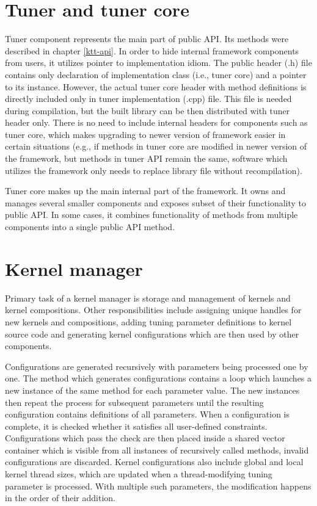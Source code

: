 \documentclass
[
    digital, %
    oneside, %
    table, %
    nolof, %
    nolot, %
    nocover %
]{fithesis3}
\begin{document}
\section{Tuner and tuner core}
Tuner component represents the main part of public API. Its methods were described in chapter \ref{ktt-api}. In order to hide internal framework
components from users, it utilizes pointer to implementation idiom. The public header (.h) file contains only declaration of implementation class
(i.e., tuner core) and a pointer to its instance. However, the actual tuner core header with method definitions is directly included only in tuner
implementation (.cpp) file. This file is needed during compilation, but the built library can be then distributed with tuner header only. There is
no need to include internal headers for components such as tuner core, which makes upgrading to newer version of framework easier in certain situations
(e.g., if methods in tuner core are modified in newer version of the framework, but methods in tuner API remain the same, software which utilizes the
framework only needs to replace library file without recompilation).

Tuner core makes up the main internal part of the framework. It owns and manages several smaller components and exposes subset of their functionality
to public API. In some cases, it combines functionality of methods from multiple components into a single public API method.

\section{Kernel manager}
Primary task of a kernel manager is storage and management of kernels and kernel compositions. Other responsibilities include assigning unique handles for
new kernels and compositions, adding tuning parameter definitions to kernel source code and generating kernel configurations which are then used by other
components.

Configurations are generated recursively with parameters being processed one by one. The method which generates configurations contains a loop which
launches a new instance of the same method for each parameter value. The new instances then repeat the process for subsequent parameters until the
resulting configuration contains definitions of all parameters. When a configuration is complete, it is checked whether it satisfies all user-defined
constraints. Configurations which pass the check are then placed inside a shared vector container which is visible from all instances of recursively
called methods, invalid configurations are discarded. Kernel configurations also include global and local kernel thread sizes, which are updated when
a thread-modifying tuning parameter is processed. With multiple such parameters, the modification happens in the order of their addition.
\end{document}

